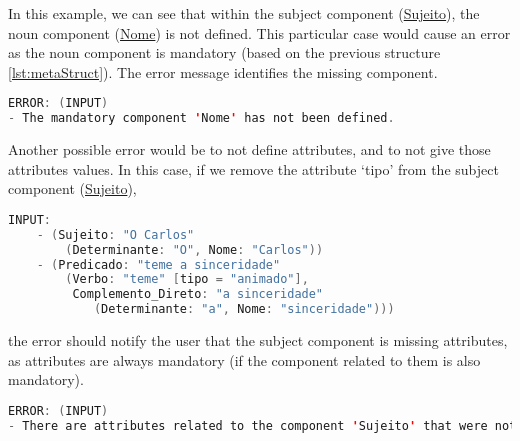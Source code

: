 In this example, we can see that within the subject component (\underline{Sujeito}), the noun component (\underline{Nome}) is not defined. 
This particular case would cause an error as the noun component is mandatory (based on the previous structure \autoref{lst:metaStruct}). 
The error message identifies the missing component.

\begin{center}
\begin{minipage}{12cm}
\begin{lstlisting}[language=java, basicstyle=\small, label={lst:err_msg_missing_comp}, caption=Example error message of missing component]
ERROR: (INPUT) 
- The mandatory component 'Nome' has not been defined.
\end{lstlisting}
\end{minipage}
\end{center}
Another possible error would be to not define attributes, and to not give those attributes values. In this case, if we remove the attribute ‘tipo’ from the subject 
component (\underline{Sujeito}),

\begin{center}
\begin{minipage}{12cm}
\begin{lstlisting}[language=java, basicstyle=\small, label={lst:meta_input_missing_attr}, caption=Example of the students parsing with missing attribute]
INPUT:
    - (Sujeito: "O Carlos"
        (Determinante: "O", Nome: "Carlos"))
    - (Predicado: "teme a sinceridade" 
        (Verbo: "teme" [tipo = "animado"], 
         Complemento_Direto: "a sinceridade" 
            (Determinante: "a", Nome: "sinceridade")))
\end{lstlisting}
\end{minipage}
\end{center}

\noindent the error should notify the user that the subject component is missing attributes, as attributes are always mandatory (if the component related to them is also
mandatory).

\begin{center}
\begin{minipage}{14cm}
\begin{lstlisting}[language=java, basicstyle=\small, label={lst:err_msg_missing_attr}, caption=Example error message of missing attributes]
ERROR: (INPUT)
- There are attributes related to the component 'Sujeito' that were not defined.
\end{lstlisting}
\end{minipage}
\end{center}

